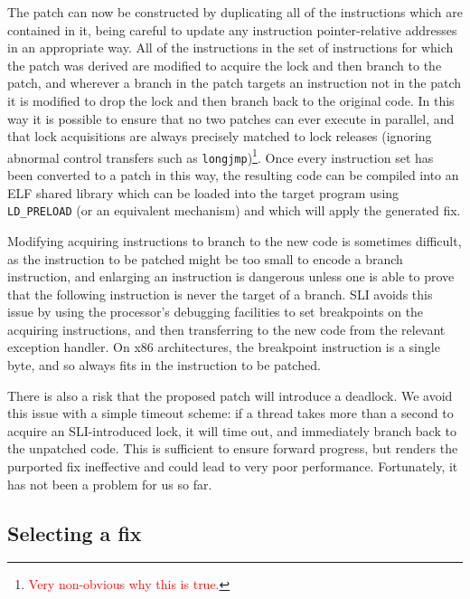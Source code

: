\documentclass[10pt,twocolumn,preprint,natbib,authoryear]{sigplanconf}
\newcommand{\editorial}[1]{\textcolor{red}{\footnote{\textcolor{red}{#1}}}}
\begin{document}
The patch can now be constructed by duplicating all of the
instructions which are contained in it, being careful to update any
instruction pointer-relative addresses in an appropriate way.  All of
the instructions in the set of instructions for which the patch was
derived are modified to acquire the lock and then branch to the patch,
and wherever a branch in the patch targets an instruction not in the
patch it is modified to drop the lock and then branch back to the
original code.  In this way it is possible to ensure that no two
patches can ever execute in parallel, and that lock acquisitions are
always precisely matched to lock releases (ignoring abnormal control
transfers such as \verb|longjmp|)\editorial{Very non-obvious why this
  is true.}.  Once every instruction set has been converted to a patch
in this way, the resulting code can be compiled into an ELF shared
library which can be loaded into the target program using
\verb|LD_PRELOAD| (or an equivalent mechanism) and which will apply
the generated fix.

Modifying acquiring instructions to branch to the new code is
sometimes difficult, as the instruction to be patched might be too
small to encode a branch instruction, and enlarging an instruction is
dangerous unless one is able to prove that the following instruction
is never the target of a branch.  SLI avoids this issue by using the
processor's debugging facilities to set breakpoints on the acquiring
instructions, and then transferring to the new code from the relevant
exception handler.  On x86 architectures, the breakpoint instruction
is a single byte, and so always fits in the instruction to be patched.

There is also a risk that the proposed patch will introduce a
deadlock.  We avoid this issue with a simple timeout scheme: if a
thread takes more than a second to acquire an SLI-introduced lock, it
will time out, and immediately branch back to the unpatched code.
This is sufficient to ensure forward progress, but renders the
purported fix ineffective and could lead to very poor performance.
Fortunately, it has not been a problem for us so far.

\subsection{Selecting a fix}
\label{sect:selectfix}
\end{document}
